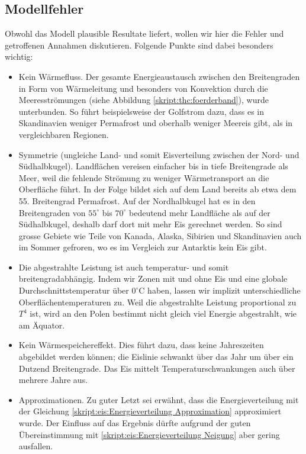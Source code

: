\begin{refsection}
\section{Modellfehler}
Obwohl das Modell plausible Resultate liefert, wollen wir hier die Fehler und getroffenen Annahmen diskutieren. Folgende Punkte sind dabei besonders wichtig:
\begin{itemize}
	\item Kein Wärmefluss. Der gesamte Energieaustausch zwischen den Breitengraden in Form von Wärmeleitung und besonders von Konvektion durch die Meeresströmungen (siehe Abbildung \ref{skript:thc:foerderband}), wurde unterbunden. So führt beispielsweise der Golfstrom dazu, dass es in Skandinavien weniger Permafrost und oberhalb weniger Meereis gibt, als in vergleichbaren Regionen.
	\item Symmetrie (ungleiche Land- und somit Eisverteilung zwischen der Nord- und Südhalbkugel). Landflächen vereisen einfacher bis in tiefe Breitengrade als Meer, weil die fehlende Strömung zu weniger Wärmetransport an die Oberfläche führt. In der Folge bildet sich auf dem Land bereits ab etwa dem 55. Breitengrad Permafrost. Auf der Nordhalbkugel hat es in den Breitengraden von $55^\circ$ bis $70^\circ$ bedeutend mehr Landfläche als auf der Südhalbkugel, deshalb darf dort mit mehr Eis gerechnet werden. So sind grosse Gebiete wie Teile von Kanada, Alaska, Sibirien und Skandinavien auch im Sommer gefroren, wo es im Vergleich zur Antarktis kein Eis gibt.
	\item Die abgestrahlte Leistung ist auch temperatur- und somit breitengradabhängig. Indem wir Zonen mit und ohne Eis und eine globale Durchschnittstemperatur über $0^\circ\text{C}$ haben, lassen wir implizit unterschiedliche Oberflächentemperaturen zu. Weil die abgestrahlte Leistung proportional zu $T^4$ ist, wird an den Polen bestimmt nicht gleich viel Energie abgestrahlt, wie am Äquator.
	\item Kein Wärmespeichereffekt. Dies führt dazu, dass keine Jahreszeiten abgebildet werden können; die Eislinie schwankt über das Jahr um über ein Dutzend Breitengrade. Das Eis mittelt Temperaturschwankungen auch über mehrere Jahre aus.
	\item Approximationen. Zu guter Letzt sei erwähnt, dass die Energieverteilung mit der Gleichung \eqref{skript:eis:Energieverteilung Approximation} approximiert wurde. Der Einfluss auf das Ergebnis dürfte aufgrund der guten Übereinstimmung mit \eqref{skript:eis:Energieverteilung Neigung} aber gering ausfallen.
\end{itemize}

\end{refsection}
